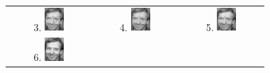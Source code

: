 \documentclass[10pt,a4paper]{article}
\begin{document}
\begin{figure}[h!]
\begin{tabular}{ c c c }
    3. \includegraphics[width=0.25\textwidth]{Final/PartialReconstruction3.jpg} & 4. \includegraphics[width=0.25\textwidth]{Final/PartialReconstruction4.jpg} & 5. \includegraphics[width=0.25\textwidth]{Final/PartialReconstruction5.jpg} \\
    6. \includegraphics[width=0.25\textwidth]{Final/PartialReconstruction6.jpg}
  \end{tabular}
\end{figure}
\end{document}
